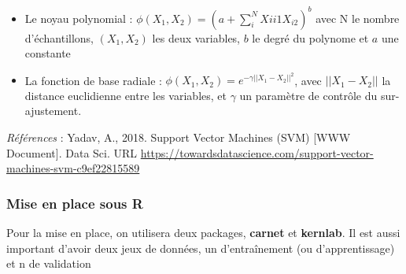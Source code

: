 \documentclass[
]{article}
\providecommand{\tightlist}{%
  \setlength{\itemsep}{0pt}\setlength{\parskip}{0pt}}
\begin{document}
\begin{itemize}
\tightlist
\item
  Le noyau polynomial : \(\phi(X_1,X_2)=(a+\sum_i^NXi{i1}X_{i2})^b\)
  avec N le nombre d'échantillons, \((X_1,X_2)\) les deux variables,
  \(b\) le degré du polynome et \(a\) une constante
\item
  La fonction de base radiale :
  \(\phi(X_1,X_2)=e^{-\gamma ||X_1-X_2||^2}\), avec \(||X_1-X_2||\) la
  distance euclidienne entre les variables, et \(\gamma\) un paramètre
  de contrôle du sur-ajustement.
\end{itemize}

\emph{Références} : Yadav, A., 2018. Support Vector Machines (SVM)
{[}WWW Document{]}. Data Sci. URL
\url{https://towardsdatascience.com/support-vector-machines-svm-c9ef22815589}

\hypertarget{mise-en-place-sous-r}{%
\subsubsection{Mise en place sous R}\label{mise-en-place-sous-r}}

Pour la mise en place, on utilisera deux packages, \textbf{carnet} et
\textbf{kernlab}. Il est aussi important d'avoir deux jeux de données,
un d'entraînement (ou d'apprentissage) et n de validation
\end{document}
